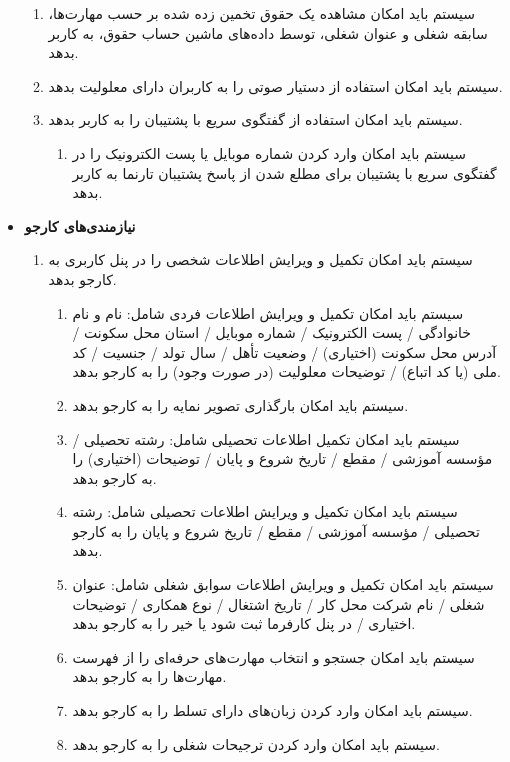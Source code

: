 \documentclass[12pt]{article}
\begin{document}
\begin{itemize}
\begin{enumerate}
			\item سیستم باید امکان مشاهده یک حقوق تخمین زده شده بر حسب مهارت‌ها، سابقه شغلی و عنوان شغلی، توسط داده‌های ماشین حساب حقوق، به کاربر بدهد.
			\item سیستم باید امکان استفاده از دستیار صوتی را به کاربران دارای معلولیت بدهد.
			\item سیستم باید امکان استفاده از گفتگوی سریع با پشتیبان را به کاربر بدهد.
			\begin{enumerate}
				\renewcommand{\labelenumii}{-R\arabic{enumi}.\arabic{enumii}}
				\item سیستم باید امکان وارد کردن شماره موبایل یا پست الکترونیک را در گفتگوی سریع با پشتیبان برای مطلع شدن از پاسخ پشتیبان تارنما به کاربر بدهد.
			\end{enumerate}
		\end{enumerate}
		\item
		\textbf{نیازمندی‌های کارجو}
		\begin{enumerate}
			\renewcommand{\labelenumi}{-R\arabic{enumi}}
			\setcounter{enumi}{21}
			\item سیستم باید امکان تکمیل و ویرایش اطلاعات شخصی را در پنل کاربری به کارجو بدهد.
			\begin{enumerate}
				\renewcommand{\labelenumii}{-R\arabic{enumi}.\arabic{enumii}}
				\item سیستم باید امکان تکمیل و ویرایش اطلاعات فردی شامل: نام و نام خانوادگی / پست الکترونیک / شماره موبایل / استان محل سکونت / آدرس محل سکونت (اختیاری) / وضعیت تأهل / سال تولد / جنسیت / کد ملی (یا کد اتباع) / توضیحات معلولیت (در صورت وجود) را به کارجو بدهد.
				\item سیستم باید امکان بارگذاری تصویر نمایه را به کارجو بدهد.
				\item سیستم باید امکان تکمیل اطلاعات تحصیلی شامل: رشته تحصیلی / مؤسسه آموزشی / مقطع / تاریخ شروع و پایان / توضیحات (اختیاری) را به کارجو بدهد.
				\item سیستم باید امکان تکمیل و ویرایش اطلاعات تحصیلی شامل: رشته تحصیلی / مؤسسه آموزشی / مقطع / تاریخ شروع و پایان را به کارجو بدهد.
				\item سیستم باید امکان تکمیل و ویرایش اطلاعات سوابق شغلی شامل: عنوان شغلی / نام شرکت محل کار / تاریخ اشتغال / نوع همکاری / توضیحات اختیاری / در پنل کارفرما ثبت شود یا خیر را به کارجو بدهد.
				\item سیستم باید امکان جستجو و انتخاب مهارت‌های حرفه‌ای را از فهرست مهارت‌ها را به کارجو بدهد.
				\item سیستم باید امکان وارد کردن زبان‌های دارای تسلط را به کارجو بدهد.
				\item سیستم باید امکان وارد کردن ترجیحات شغلی را به کارجو بدهد.

\end{enumerate}
\end{enumerate}
\end{itemize}
\end{document}
